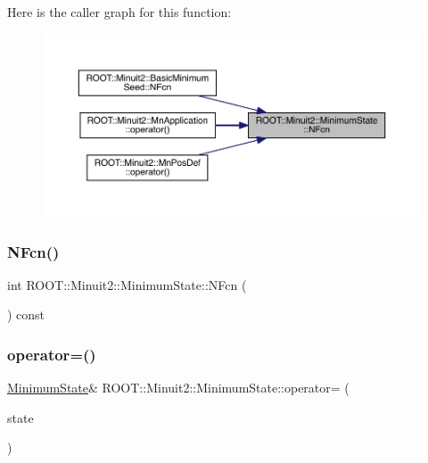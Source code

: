 Here is the caller graph for this function\+:\nopagebreak
\begin{figure}[H]
\begin{center}
\leavevmode
\includegraphics[width=350pt]{db/dcd/classROOT_1_1Minuit2_1_1MinimumState_aedc2a07bcaf49ef63ac092a867463731_icgraph}
\end{center}
\end{figure}
\mbox{\label{classROOT_1_1Minuit2_1_1MinimumState_aedc2a07bcaf49ef63ac092a867463731}} 
\subsubsection{\texorpdfstring{NFcn()}{NFcn()}\hspace{0.1cm}{\footnotesize\ttfamily [2/2]}}
{\footnotesize\ttfamily int R\+O\+O\+T\+::\+Minuit2\+::\+Minimum\+State\+::\+N\+Fcn (\begin{DoxyParamCaption}{ }\end{DoxyParamCaption}) const\hspace{0.3cm}{\ttfamily [inline]}}

\mbox{\label{classROOT_1_1Minuit2_1_1MinimumState_ad0d12f94b8f1adca2b2c4279006f82e4}} 
\subsubsection{\texorpdfstring{operator=()}{operator=()}\hspace{0.1cm}{\footnotesize\ttfamily [1/2]}}
{\footnotesize\ttfamily \mbox{\hyperlink{classROOT_1_1Minuit2_1_1MinimumState}{Minimum\+State}}\& R\+O\+O\+T\+::\+Minuit2\+::\+Minimum\+State\+::operator= (\begin{DoxyParamCaption}\item[{const \mbox{\hyperlink{classROOT_1_1Minuit2_1_1MinimumState}{Minimum\+State}} \&}]{state }\end{DoxyParamCaption})\hspace{0.3cm}{\ttfamily [inline]}}


